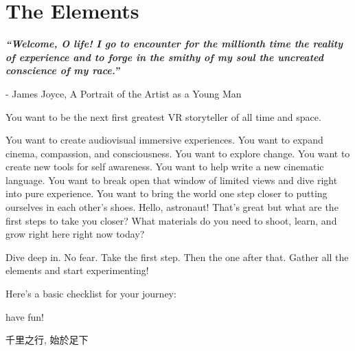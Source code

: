 \chapter{The Elements}
\pagecolor{white}
\label{chap:1}
\begin{fullwidth}

{\itshape\bfseries “Welcome, O life! I go to encounter for the millionth time the reality of experience and to forge in the smithy of my soul the uncreated conscience of my race.”}

- James Joyce, A Portrait of the Artist as a Young Man
\vspace{\baselineskip}

\problem

{\large You want to be the next first greatest VR storyteller of all time and space. \par}

You want to create audiovisual immersive experiences. You want to expand cinema, compassion, and consciousness. You want to explore change. You want to create new tools for self awareness. You want to help write a new cinematic language. You want to break open that window of limited views and dive right into pure experience. You want to bring the world one step closer to putting ourselves in each other’s shoes. Hello, astronaut! That’s great but what are the first steps to take you closer? What materials do you need to shoot, learn, and grow right here right now today?

\solution

{\large Dive deep in. No fear. Take the first step. Then the one after that. Gather all the elements and start experimenting! \par}

Here’s a basic checklist for your journey:
\clearpage
{}




have fun!

\begin{CJK*}{UTF8}{gbsn}
千里之行, 始於足下
\clearpage\end{CJK*}

\clearpage
\end{fullwidth}
